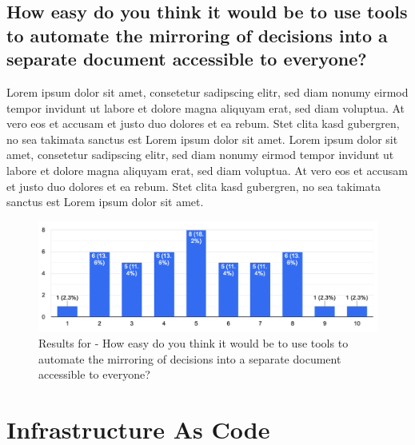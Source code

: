 \subsection{How easy do you think it would be to use tools to automate the mirroring of decisions into a separate document accessible to everyone?}
Lorem ipsum dolor sit amet, consetetur sadipscing elitr, sed diam nonumy eirmod tempor invidunt ut labore et dolore magna aliquyam erat, sed diam voluptua. At vero eos et accusam et justo duo dolores et ea rebum. Stet clita kasd gubergren, no sea takimata sanctus est Lorem ipsum dolor sit amet. Lorem ipsum dolor sit amet, consetetur sadipscing elitr, sed diam nonumy eirmod tempor invidunt ut labore et dolore magna aliquyam erat, sed diam voluptua. At vero eos et accusam et justo duo dolores et ea rebum. Stet clita kasd gubergren, no sea takimata sanctus est Lorem ipsum dolor sit amet.
\begin{figure}[h!]
\centering
\includegraphics[width=\linewidth]{Images/Survey/decisions_5.png}
\caption{Results for - How easy do you think it would be to use tools to automate the mirroring of decisions into a separate document accessible to everyone?}
\label{fig:results:decisions:5}
\end{figure}


\section{Infrastructure As Code}

